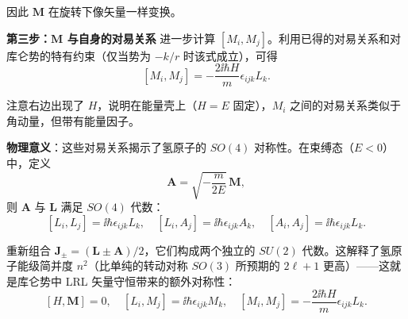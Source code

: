 \begin{solution}
	因此 $\mathbf M$ 在旋转下像矢量一样变换。

	\textbf{第三步：$\mathbf M$ 与自身的对易关系} 进一步计算 $[M_i,M_j]$。利用已得的对易关系和对库仑势的特有约束（仅当势为 $-k/r$ 时该式成立），可得
	\[
	[M_i,M_j] = -\frac{2\ii\hbar H}{m}\epsilon_{ijk}L_k.
	\]

	注意右边出现了 $H$，说明在能量壳上（$H=E$ 固定），$M_i$ 之间的对易关系类似于角动量，但带有能量因子。

	\textbf{物理意义}：这些对易关系揭示了氢原子的 $SO(4)$ 对称性。在束缚态（$E<0$）中，定义
	\[
	\mathbf A = \sqrt{-\frac{m}{2E}}\,\mathbf M,
	\]
	则 $\mathbf A$ 与 $\mathbf L$ 满足 $SO(4)$ 代数：
	\[
	[L_i,L_j]=\ii\hbar\epsilon_{ijk}L_k,\quad
	[L_i,A_j]=\ii\hbar\epsilon_{ijk}A_k,\quad
	[A_i,A_j]=\ii\hbar\epsilon_{ijk}L_k.
	\]

	重新组合 $\mathbf J_\pm = (\mathbf L\pm\mathbf A)/2$，它们构成两个独立的 $SU(2)$ 代数。这解释了氢原子能级简并度 $n^2$（比单纯的转动对称 $SO(3)$ 所预期的 $2\ell+1$ 更高）——这就是库仑势中 LRL 矢量守恒带来的额外对称性：
	\[
	\boxed{[H,\mathbf M]=0,\quad [L_i,M_j]=\ii\hbar\epsilon_{ijk}M_k,\quad
	[M_i,M_j]=-\frac{2\ii\hbar H}{m}\epsilon_{ijk}L_k}.
	\]
	\end{solution}


